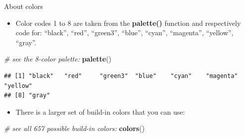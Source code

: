 \documentclass[]{book}
\newenvironment{Shaded}{\begin{snugshade}}{\end{snugshade}}
\newcommand{\CommentTok}[1]{\textcolor[rgb]{0.56,0.35,0.01}{\textit{#1}}}
\newcommand{\KeywordTok}[1]{\textcolor[rgb]{0.13,0.29,0.53}{\textbf{#1}}}
\newcommand{\NormalTok}[1]{#1}
\providecommand{\tightlist}{%
  \setlength{\itemsep}{0pt}\setlength{\parskip}{0pt}}
\begin{document}
About colors

\begin{itemize}
\tightlist
\item
  Color codes 1 to 8 are taken from the \textbf{palette()} function and respectively code for: ``black'', ``red'', ``green3'', ``blue'', ``cyan'', ``magenta'', ``yellow'', ``gray''.
\end{itemize}

\begin{Shaded}
\begin{Highlighting}[]
\CommentTok{# see the 8-color palette:}
\KeywordTok{palette}\NormalTok{()}
\end{Highlighting}
\end{Shaded}

\begin{verbatim}
## [1] "black"   "red"     "green3"  "blue"    "cyan"    "magenta" "yellow" 
## [8] "gray"
\end{verbatim}

\begin{itemize}
\tightlist
\item
  There is a larger set of build-in colors that you can use:
\end{itemize}

\begin{Shaded}
\begin{Highlighting}[]
\CommentTok{# see all 657 possible build-in colors:}
\KeywordTok{colors}\NormalTok{()}
\end{Highlighting}
\end{Shaded}
\end{document}

